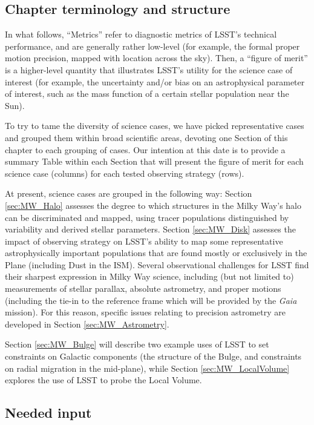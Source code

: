 \subsection{Chapter terminology and structure}

In what follows, ``Metrics'' refer to diagnostic metrics of LSST's
technical performance, and are generally rather low-level (for
example, the formal proper motion precision, mapped with location
across the sky). Then, a ``figure of merit'' is a higher-level
quantity that illustrates LSST's utility for the science case of
interest (for example, the uncertainty and/or bias on an astrophysical
parameter of interest, such as the mass function of a certain stellar
population near the Sun).

To try to tame the diversity of science cases, we have picked
representative cases and grouped them within broad scientific areas,
devoting one Section of this chapter to each grouping of cases. Our
intention at this date is to provide a summary Table within each
Section that will present the figure of merit for each science case
(columns) for each tested observing strategy (rows).

At present, science cases are grouped in the following way: Section
\ref{sec:MW_Halo} assesses the degree to which structures in the Milky
Way's halo can be discriminated and mapped, using tracer populations
distinguished by variability and derived stellar parameters. Section
\ref{sec:MW_Disk} assesses the impact of observing strategy on LSST's
ability to map some representative astrophysically important
populations that are found mostly or exclusively in the Plane
(including Dust in the ISM). Several observational challenges for LSST
find their sharpest expression in Milky Way science, including (but
not limited to) measurements of stellar parallax, absolute astrometry,
and proper motions (including the tie-in to the reference frame which
will be provided by the {\it Gaia} mission). For this reason, specific
issues relating to precision astrometry are developed in Section
\ref{sec:MW_Astrometry}.

Section \ref{sec:MW_Bulge} will describe two example uses of LSST to
set constraints on Galactic components (the structure of the Bulge,
and constraints on radial migration in the mid-plane), while Section
\ref{sec:MW_LocalVolume} explores the use of LSST to probe the Local
Volume.

\subsection{Needed input}

